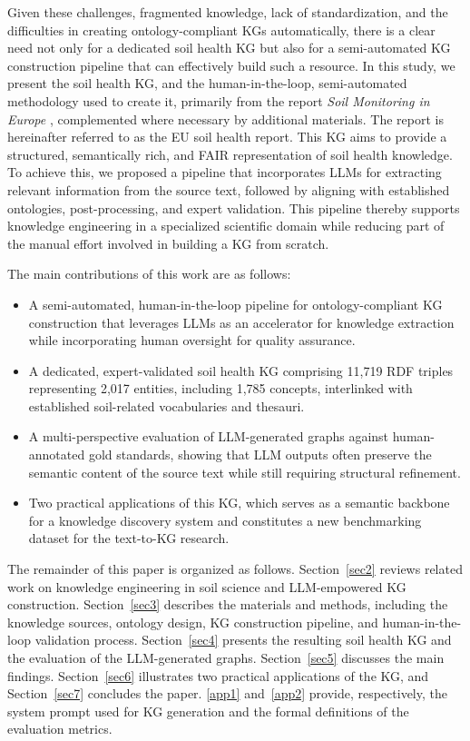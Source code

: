 \documentclass[preprint,12pt]{elsarticle}
\begin{document}
Given these challenges, fragmented knowledge, lack of standardization, and the difficulties in creating ontology-compliant KGs automatically, there is a clear need not only for a dedicated soil health KG but also for a semi-automated KG construction pipeline that can effectively build such a resource. In this study, we present the soil health KG, and the human-in-the-loop, semi-automated methodology used to create it, primarily from the report \textit{Soil Monitoring in Europe} \citep{doi/10.2800/956606}, complemented where necessary by additional materials. The report is hereinafter referred to as the EU soil health report. This KG aims to provide a structured, semantically rich, and FAIR \citep{Wilkinson2016} representation of soil health knowledge. To achieve this, we proposed a pipeline that incorporates LLMs for extracting relevant information from the source text, followed by aligning with established ontologies, post-processing, and expert validation. This pipeline thereby supports knowledge engineering in a specialized scientific domain while reducing part of the manual effort involved in building a KG from scratch.

The main contributions of this work are as follows:
\begin{itemize}
    \item A semi-automated, human-in-the-loop pipeline for ontology-compliant KG construction that leverages LLMs as an accelerator for knowledge extraction while incorporating human oversight for quality assurance.
    \item A dedicated, expert-validated soil health KG comprising 11,719 RDF triples representing 2,017 entities, including 1,785 concepts, interlinked with established soil-related vocabularies and thesauri.
    \item A multi-perspective evaluation of LLM-generated graphs against human-annotated gold standards, showing that LLM outputs often preserve the semantic content of the source text while still requiring structural refinement.
    \item Two practical applications of this KG, which serves as a semantic backbone for a knowledge discovery system and constitutes a new benchmarking dataset for the text-to-KG research.
\end{itemize}

The remainder of this paper is organized as follows. Section~\ref{sec2} reviews related work on knowledge engineering in soil science and LLM-empowered KG construction. Section~\ref{sec3} describes the materials and methods, including the knowledge sources, ontology design, KG construction pipeline, and human-in-the-loop validation process. Section~\ref{sec4} presents the resulting soil health KG and the evaluation of the LLM-generated graphs. Section~\ref{sec5} discusses the main findings. Section~\ref{sec6} illustrates two practical applications of the KG, and Section~\ref{sec7} concludes the paper. \ref{app1} and~\ref{app2} provide, respectively, the system prompt used for KG generation and the formal definitions of the evaluation metrics.
\end{document}
